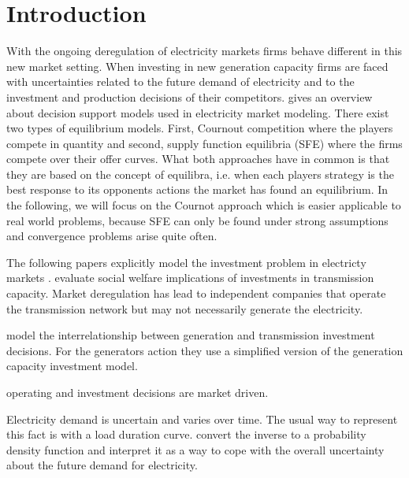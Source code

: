 \section{Introduction}

With the ongoing deregulation of electricity markets firms behave different in this new market setting. When investing in new generation capacity firms are faced with uncertainties related to the future demand of electricity and to the investment and production decisions of their competitors. \cite{Ventosa2005} gives an overview about decision support models used in electricity market modeling. There exist two types of equilibrium models. First, Cournout competition where the players compete in quantity and second, supply function equilibria (SFE) where the firms compete over their offer curves. What both approaches have in common is that they are based on the concept of \cite{Nash1951} equilibra, i.e. when each players strategy is the best response to its opponents actions the market has found an equilibrium. In the following, we will focus on the Cournot approach which is easier applicable to real world problems, because SFE can only be found under strong assumptions and convergence problems arise quite often.

The following papers explicitly model the investment problem in electricty markets \cite{Ventosa2002, Pineau2003, Murphy2005, Sauma2006, Barmack2007, Genc2007, Kiesling2007}. \cite{Sauma2006} evaluate social welfare implications of investments in transmission capacity. Market deregulation has lead to independent companies that operate the transmission network but may not necessarily generate the electricity.

\cite{Sauma2006} model the interrelationship between generation and transmission investment decisions. For the generators action they use a simplified version of the \cite{Murphy2005} generation capacity investment model.



operating and investment decisions are market driven.

Electricity demand is uncertain and varies over time. The usual way to represent this fact is with a load duration curve. \cite{Murphy2005} convert the inverse to a probability density function and interpret it as a way to cope with the overall uncertainty about the future demand for electricity.

